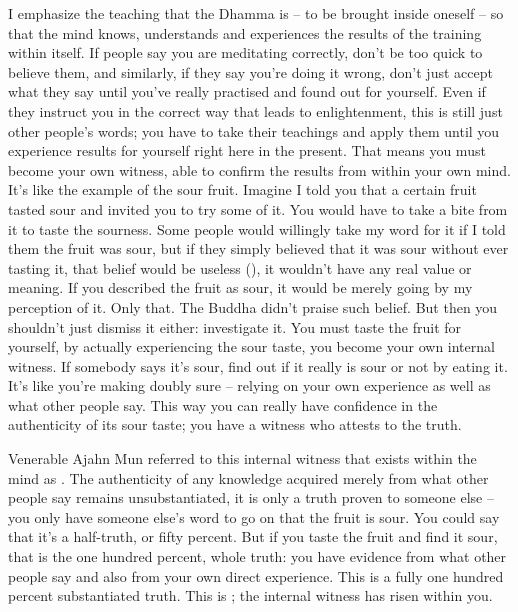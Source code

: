 I emphasize the teaching that the Dhamma is  -- to be brought inside oneself -- so that the mind knows, understands and experiences the results of the training within itself. If people say you are meditating correctly, don't be too quick to believe them, and similarly, if they say you're doing it wrong, don't just accept what they say until you've really practised and found out for yourself. Even if they instruct you in the correct way that leads to enlightenment, this is still just other people's words; you have to take their teachings and apply them until you experience results for yourself right here in the present. That means you must become your own witness, able to confirm the results from within your own mind. It's like the example of the sour fruit. Imagine I told you that a certain fruit tasted sour and invited you to try some of it. You would have to take a bite from it to taste the sourness. Some people would willingly take my word for it if I told them the fruit was sour, but if they simply believed that it was sour without ever tasting it, that belief would be useless (), it wouldn't have any real value or meaning. If you described the fruit as sour, it would be merely going by my perception of it. Only that. The Buddha didn't praise such belief. But then you shouldn't just dismiss it either: investigate it. You must taste the fruit for yourself, by actually experiencing the sour taste, you become your own internal witness. If somebody says it's sour, find out if it really is sour or not by eating it. It's like you're making doubly sure -- relying on your own experience as well as what other people say. This way you can really have confidence in the authenticity of its sour taste; you have a witness who attests to the truth. 

Venerable Ajahn Mun referred to this internal witness that exists within the mind as . The authenticity of any knowledge acquired merely from what other people say remains unsubstantiated, it is only a truth proven to someone else -- you only have someone else's word to go on that the fruit is sour. You could say that it's a half-truth, or fifty percent. But if you taste the fruit and find it sour, that is the one hundred percent, whole truth: you have evidence from what other people say and also from your own direct experience. This is a fully one hundred percent substantiated truth. This is ; the internal witness has risen within you.


